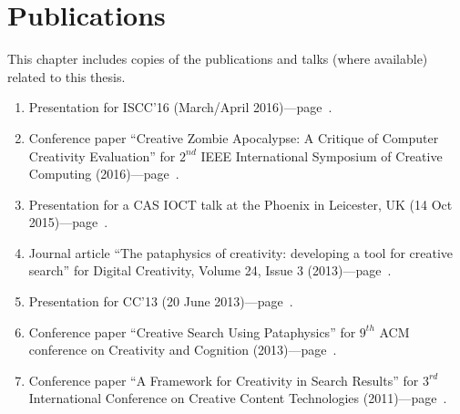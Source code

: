 
\chapter{Publications}
\label{app:pub}

\vspace{5cm}


This chapter includes copies of the publications and talks (where available) related to this thesis.




\begin{enumerate}
  \item Presentation for ISCC'16 (March/April 2016)---page~\pageref{s:iscc16talk}.
  \item Conference paper ``Creative Zombie Apocalypse: A Critique of Computer Creativity Evaluation'' for $2^{nd}$ IEEE International Symposium of Creative Computing (2016)---page~\pageref{s:iscc16pub}.
  \item Presentation for a \ac{CAS} \ac{IOCT} talk at the Phoenix in Leicester, UK (14 Oct 2015)---page~\pageref{s:castalk}.
  \item Journal article ``The pataphysics of creativity: developing a tool for creative search'' for Digital Creativity, Volume 24, Issue 3 (2013)---page~\pageref{s:dc243article}.
  \item Presentation for CC'13 (20 June 2013)---page~\pageref{s:cc13talk}.
  \item Conference paper ``Creative Search Using Pataphysics'' for $9^{th}$ ACM conference on Creativity and Cognition (2013)---page~\pageref{s:cc13pub}.
  \item Conference paper ``A Framework for Creativity in Search Results'' for $3^{rd}$ International Conference on Creative Content Technologies (2011)---page~\pageref{s:content11pub}.
\end{enumerate}

\addtocounter{section}{1}
\label{s:iscc16talk}



